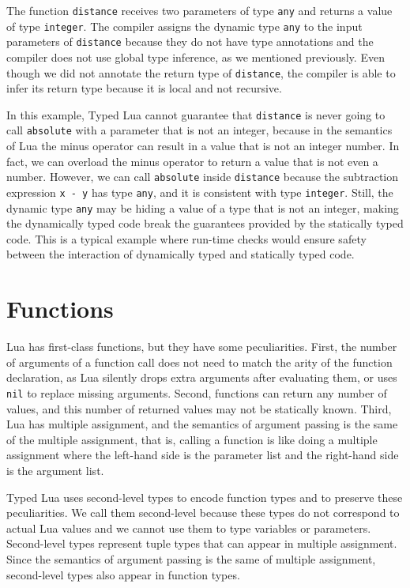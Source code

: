 The function \texttt{distance} receives two parameters of type \texttt{any}
and returns a value of type \texttt{integer}.
The compiler assigns the dynamic type \texttt{any} to the input
parameters of \texttt{distance} because they do not have type annotations
and the compiler does not use global type inference, as we mentioned
previously.
Even though we did not annotate the return type of \texttt{distance},
the compiler is able to infer its return type because it is local
and not recursive.

In this example, Typed Lua cannot guarantee that \texttt{distance} is never
going to call \texttt{absolute} with a parameter that is not an integer,
because in the semantics of Lua the minus operator can result in a
value that is not an integer number.
In fact, we can overload the minus operator to return a value that is
not even a number.
However, we can call \texttt{absolute} inside \texttt{distance}
because the subtraction expression \texttt{x - y} has type \texttt{any},
and it is consistent with type \texttt{integer}.
Still, the dynamic type \texttt{any} may be hiding a value of a type
that is not an integer, making the dynamically typed code break the
guarantees provided by the statically typed code.
This is a typical example where run-time checks would ensure safety
between the interaction of dynamically typed and statically typed code.

\section{Functions}
\label{sec:functions}

Lua has first-class functions, but they have some peculiarities.
First, the number of arguments of a function call does
not need to match the arity of the function declaration, as Lua silently
drops extra arguments after evaluating them, or uses \texttt{nil} to
replace missing arguments.
Second, functions can return any number of values,
and this number of returned values may not be statically known.
Third, Lua has multiple assignment, and the semantics
of argument passing is the same of the multiple assignment, that is,
calling a function is like doing a multiple assignment where the
left-hand side is the parameter list and the right-hand side is the
argument list.

Typed Lua uses second-level types to encode function types
and to preserve these peculiarities.
We call them second-level because these types do not correspond
to actual Lua values and we cannot use them to type variables or
parameters.
Second-level types represent tuple types that can appear in multiple assignment.
Since the semantics of argument passing is the same of multiple assignment,
second-level types also appear in function types.

